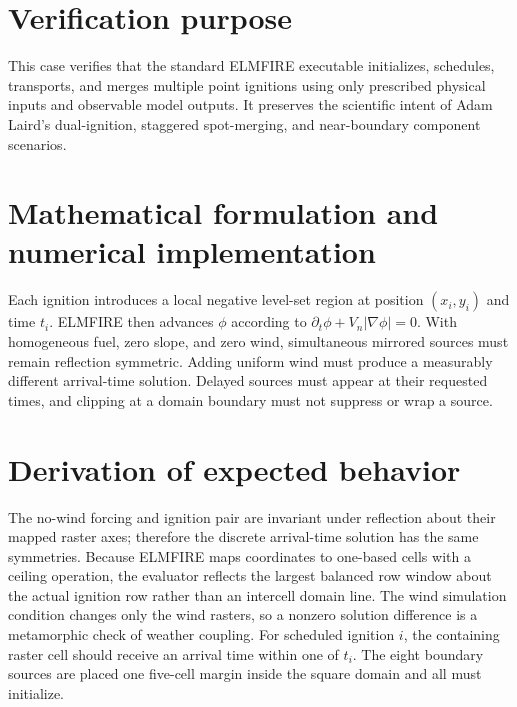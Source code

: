\section{Verification purpose}

This case verifies that the standard ELMFIRE executable initializes, schedules, transports, and merges multiple point ignitions using only prescribed physical inputs and observable model outputs. It preserves the scientific intent of Adam Laird's dual-ignition, staggered spot-merging, and near-boundary component scenarios.

\section{Mathematical formulation and numerical implementation}

Each ignition introduces a local negative level-set region at position $(x_i,y_i)$ and time $t_i$. ELMFIRE then advances $\phi$ according to $\partial_t\phi+V_n|\nabla\phi|=0$. With homogeneous fuel, zero slope, and zero wind, simultaneous mirrored sources must remain reflection symmetric. Adding uniform wind must produce a measurably different arrival-time solution. Delayed sources must appear at their requested times, and clipping at a domain boundary must not suppress or wrap a source.

\section{Derivation of expected behavior}

The no-wind forcing and ignition pair are invariant under reflection about their mapped raster axes; therefore the discrete arrival-time solution has the same symmetries. Because ELMFIRE maps coordinates to one-based cells with a ceiling operation, the evaluator reflects the largest balanced row window about the actual ignition row rather than an intercell domain line. The wind simulation condition changes only the wind rasters, so a nonzero solution difference is a metamorphic check of weather coupling. For scheduled ignition $i$, the containing raster cell should receive an arrival time within one \OutputInterval{} of $t_i$. The eight boundary sources are placed one five-cell margin inside the square domain and all must initialize.

